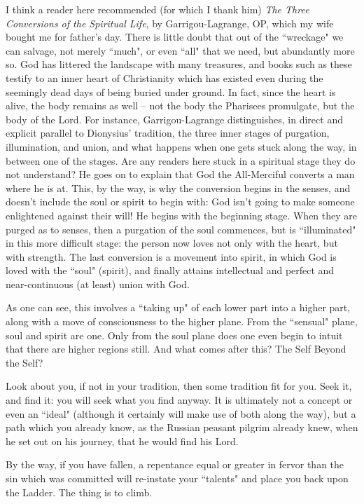 I think a reader here recommended (for which I thank him) \emph{The Three Conversions of the Spiritual Life}, by Garrigou-Lagrange, OP, which my wife bought me for father's day. There is little doubt that out of the ``wreckage" we can salvage, not merely ``much", or even ``all" that we need, but abundantly more so. God has littered the landscape with many treasures, and books such as these testify to an inner heart of Christianity which has existed even during the seemingly dead days of being buried under ground. In fact, since the heart is alive, the body remains as well – not the body the Pharisees promulgate, but the body of the Lord. For instance, Garrigou-Lagrange distinguishes, in direct and explicit parallel to Dionysius' tradition, the three inner stages of purgation, illumination, and union, and what happens when one gets stuck along the way, in between one of the stages. Are any readers here stuck in a spiritual stage they do not understand? He goes on to explain that God the All-Merciful converts a man where he is at. This, by the way, is why the conversion begins in the senses, and doesn't include the soul or spirit to begin with: God isn't going to make someone enlightened against their will! He begins with the beginning stage. When they are purged as to senses, then a purgation of the soul commences, but is ``illuminated" in this more difficult stage: the person now loves not only with the heart, but with strength. The last conversion is a movement into spirit, in which God is loved with the ``soul" (spirit), and finally attains intellectual and perfect and near-continuous (at least) union with God.

As one can see, this involves a ``taking up" of each lower part into a higher part, along with a move of consciousness to the higher plane. From the ``sensual" plane, soul and spirit are one. Only from the soul plane does one even begin to intuit that there are higher regions still. And what comes after this? The Self Beyond the Self?

Look about you, if not in your tradition, then some tradition fit for you. Seek it, and find it: you will seek what you find anyway. It is ultimately not a concept or even an ``ideal" (although it certainly will make use of both along the way), but a path which you already know, as the Russian peasant pilgrim already knew, when he set out on his journey, that he would find his Lord.

By the way, if you have fallen, a repentance equal or greater in fervor than the sin which was committed will re-instate your ``talents" and place you back upon the Ladder. The thing is to climb.



